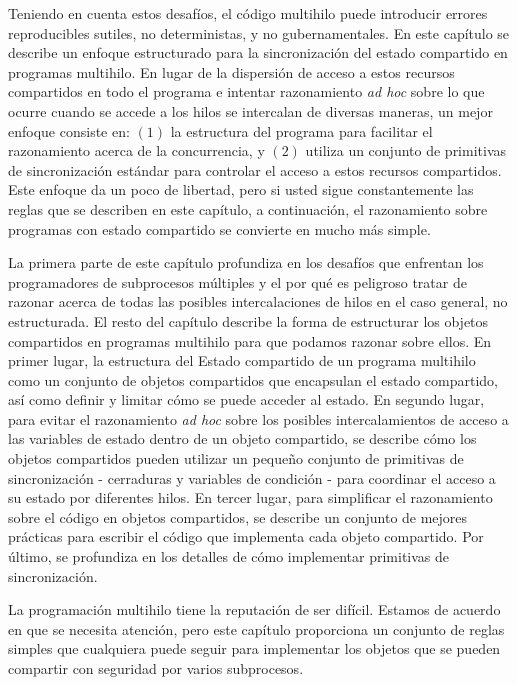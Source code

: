 \documentclass[10pt]{book}
\begin{document}
Teniendo en cuenta estos desafíos, el código multihilo puede introducir errores reproducibles sutiles, no deterministas, y no gubernamentales. En este capítulo se describe un enfoque estructurado para la sincronización del estado compartido en programas multihilo. En lugar de la dispersión de acceso a estos recursos compartidos en todo el programa e intentar razonamiento \textit{ad hoc} sobre lo que ocurre cuando se accede a los hilos se intercalan de diversas maneras, un mejor enfoque consiste en: $(1)$ la estructura del programa para facilitar el razonamiento acerca de la concurrencia, y $(2)$ utiliza un conjunto de primitivas de sincronización estándar para controlar el acceso a estos recursos compartidos. Este enfoque da un poco de libertad, pero si usted sigue constantemente las reglas que se describen en este capítulo, a continuación, el razonamiento sobre programas con estado compartido se convierte en mucho más simple.

La primera parte de este capítulo profundiza en los desafíos que enfrentan los programadores de subprocesos múltiples y el por qué es peligroso tratar de razonar acerca de todas las posibles intercalaciones de hilos en el caso general, no estructurada. El resto del capítulo describe la forma de estructurar los objetos compartidos en programas multihilo para que podamos razonar sobre ellos. En primer lugar, la estructura del Estado compartido de un programa multihilo como un conjunto de objetos compartidos que encapsulan el estado compartido, así como definir y limitar cómo se puede acceder al estado. En segundo lugar, para evitar el razonamiento \textit{ad hoc} sobre los posibles intercalamientos de acceso a las variables de estado dentro de un objeto compartido, se describe cómo los objetos compartidos pueden utilizar un pequeño conjunto de primitivas de sincronización - cerraduras y variables de condición - para coordinar el acceso a su estado por diferentes hilos. En tercer lugar, para simplificar el razonamiento sobre el código en objetos compartidos, se describe un conjunto de mejores prácticas para escribir el código que implementa cada objeto compartido. Por último, se profundiza en los detalles de cómo implementar primitivas de sincronización.

La programación multihilo tiene la reputación de ser difícil. Estamos de acuerdo en que se necesita atención, pero este capítulo proporciona un conjunto de reglas simples que cualquiera puede seguir para implementar los objetos que se pueden compartir con seguridad por varios subprocesos.
\end{document}

